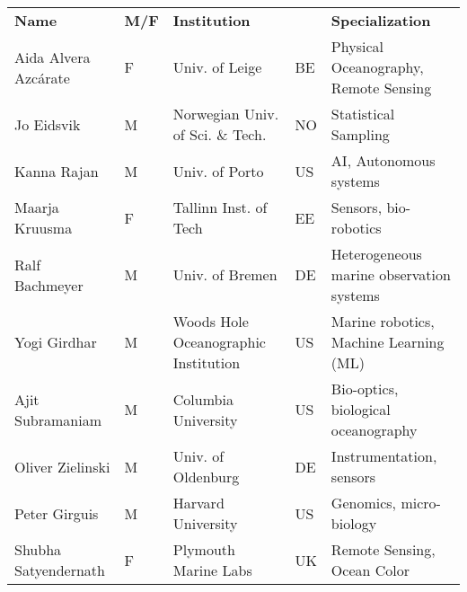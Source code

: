 \begin{table}[!t]
  \footnotesize{
\begin{tabular}{|p{3.5cm}|p{0.7cm}|p{4.0cm}|p{0.5cm}|p{6.0cm}|}
  \rowcolor{Gray}
  \bfseries Name& \bfseries M/F&\bfseries Institution & & \bfseries Specialization\\
  Aida Alvera Azc\'{a}rate    & F   & Univ. of Leige                        & BE       &Physical Oceanography, Remote Sensing\\
  \hline
  Jo Eidsvik               & M   & Norwegian Univ. of Sci. \& Tech.        & NO       & Statistical Sampling                            \\
  \hline
  Kanna Rajan              & M   & Univ. of Porto            & US       & AI, Autonomous systems           \\
  \hline
  Maarja Kruusma  & F   & Tallinn Inst. of Tech
                                                      & EE  & Sensors,
                                                              bio-robotics                                \\
  \hline
  Ralf Bachmeyer           & M   & Univ. of Bremen                       & DE       & Heterogeneous marine observation systems                        \\
  \hline
  Yogi Girdhar             & M   & Woods Hole Oceanographic Institution
                                                      & US       &
                                                                   Marine
                                                                   robotics,
                                                                   Machine
                                                                   Learning
  (ML)\\
  \hline
  Ajit Subramaniam         & M   & Columbia University
                                                      & US       &
                                                                   Bio-optics, biological oceanography                        \\
  \hline
  Oliver Zielinski          & M   & Univ. of Oldenburg                   & DE       & Instrumentation, sensors                        \\
  \hline
  Peter Girguis            & M   & Harvard University                               & US       & Genomics, micro-biology                         \\
  \hline
  Shubha Satyendernath     & F   & Plymouth Marine Labs                  & UK       & Remote Sensing, Ocean Color                     \\

\end{tabular}}
\end{table}
